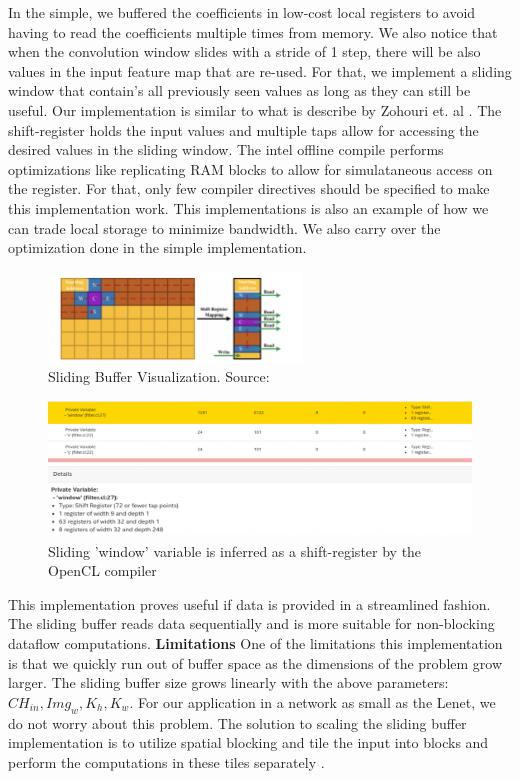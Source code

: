 In the simple, we buffered the coefficients in low-cost local registers to avoid having to read the coefficients multiple times from memory. We also notice that when the convolution window slides with a stride of 1 step, there will be also values in the input feature map that are re-used. For that, we implement a sliding window that contain's all previously seen values as long as they can still be useful. Our implementation is similar to what is describe by Zohouri et. al \cite{2018combined}. The shift-register holds the input values and multiple taps allow for accessing the desired values in the sliding window. The intel offline compile performs optimizations like replicating RAM blocks to allow for simulataneous access on the register. For that, only few compiler directives should be specified to make this implementation work. This implementations is also an example of how we can trade local storage to minimize bandwidth. We also carry over the optimization done in the simple implementation.

\begin{figure}[h]
\centering
\includegraphics[width=0.6\textwidth]{Figures/slidingbuffer}
\decoRule
\caption[SlidingBuffer]{ Sliding Buffer Visualization. Source: \cite{2018combined}}
\label{fig:sliding buffer}
\end{figure}

\begin{figure}[h]
\centering
\includegraphics[width=1.0\textwidth]{Figures/shiftregister}
\decoRule
\caption[ShiftRegister]{ Sliding 'window' variable is inferred as a shift-register by the OpenCL compiler }
\label{fig:shiftregister}
\end{figure}

This implementation proves useful if data is provided in a streamlined fashion. The sliding buffer reads data sequentially and is more suitable for non-blocking dataflow computations.
\newline
\textbf{Limitations}
\newline
One of the limitations this implementation is that we quickly run out of buffer space as the dimensions of the problem grow larger. The sliding buffer size grows linearly with the above parameters: $ CH_{in}, Img_{w}, K_h, K_w $. For our application in a network as small as the Lenet, we do not worry about this problem. The solution to scaling the sliding buffer implementation is to utilize spatial blocking and tile the input into blocks and perform the computations in these tiles separately \cite{2018combined}.

